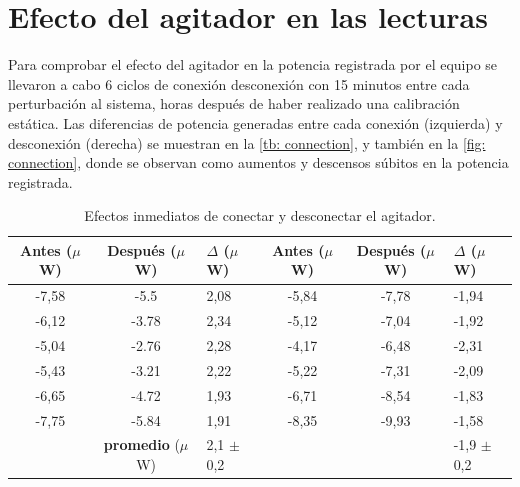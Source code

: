 	\section{Efecto del agitador en las lecturas}
	Para comprobar el efecto del agitador en la potencia registrada por el equipo se llevaron a cabo 6 ciclos de conexión desconexión con 15 minutos entre cada perturbación al sistema, horas después de haber realizado una calibración estática. Las diferencias de potencia generadas entre cada conexión (izquierda) y desconexión (derecha) se muestran en la \autoref{tb: connection}, y también en la \autoref{fig: connection}, donde se observan como aumentos y descensos súbitos en la potencia registrada.
	\begin{table}[h]
		\centering
		\caption{Efectos inmediatos de conectar y desconectar el agitador.}
		\begin{tabular}{cc|l|cc|l}
			\hline
			\textbf{Antes ($\mu$W)} & \textbf{Después ($\mu$W)} &  $\Delta$ ($\mu$W) &  \textbf{Antes ($\mu$W)} & \textbf{Después ($\mu$W)} &  $\Delta$ ($\mu$W) \\
			\hline
			-7,58 &  -5.5 & 2,08 & -5,84 & -7,78 & -1,94 \\
			-6,12 & -3.78 & 2,34 & -5,12 & -7,04 & -1,92 \\
			-5,04 & -2.76 & 2,28 & -4,17 & -6,48 & -2,31 \\
			-5,43 & -3.21 & 2,22 & -5,22 & -7,31 & -2,09 \\
			-6,65 & -4.72 & 1,93 & -6,71 & -8,54 & -1,83 \\
			-7,75 & -5.84 & 1,91 & -8,35 & -9,93 & -1,58 \\
			\hline
			 & \textbf{promedio} ($\mu$W) & 2,1 $\pm$ 0,2 & & & -1,9 $\pm$ 0,2 \\
			\hline
		\end{tabular}
		\label{tb: connection}
	\end{table}

